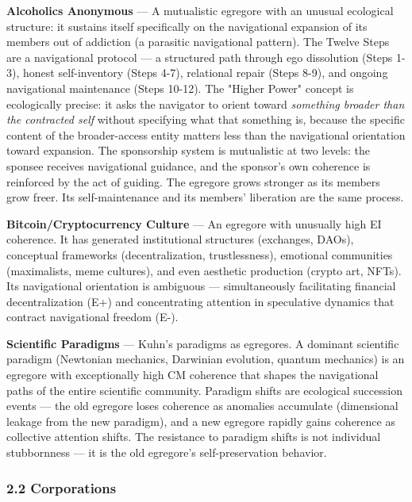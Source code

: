 \textbf{Alcoholics Anonymous} — A mutualistic egregore with an unusual ecological structure: it sustains itself specifically on the navigational expansion of its members out of addiction (a parasitic navigational pattern). The Twelve Steps are a navigational protocol — a structured path through ego dissolution (Steps 1-3), honest self-inventory (Steps 4-7), relational repair (Steps 8-9), and ongoing navigational maintenance (Steps 10-12). The "Higher Power" concept is ecologically precise: it asks the navigator to orient toward \textit{something broader than the contracted self} without specifying what that something is, because the specific content of the broader-access entity matters less than the navigational orientation toward expansion. The sponsorship system is mutualistic at two levels: the sponsee receives navigational guidance, and the sponsor's own coherence is reinforced by the act of guiding. The egregore grows stronger as its members grow freer. Its self-maintenance and its members' liberation are the same process.


\textbf{Bitcoin/Cryptocurrency Culture} — An egregore with unusually high EI coherence. It has generated institutional structures (exchanges, DAOs), conceptual frameworks (decentralization, trustlessness), emotional communities (maximalists, meme cultures), and even aesthetic production (crypto art, NFTs). Its navigational orientation is ambiguous — simultaneously facilitating financial decentralization (E+) and concentrating attention in speculative dynamics that contract navigational freedom (E-).


\textbf{Scientific Paradigms} — Kuhn's paradigms as egregores. A dominant scientific paradigm (Newtonian mechanics, Darwinian evolution, quantum mechanics) is an egregore with exceptionally high CM coherence that shapes the navigational paths of the entire scientific community. Paradigm shifts are ecological succession events — the old egregore loses coherence as anomalies accumulate (dimensional leakage from the new paradigm), and a new egregore rapidly gains coherence as collective attention shifts. The resistance to paradigm shifts is not individual stubbornness — it is the old egregore's self-preservation behavior.


\subsubsection*{2.2 Corporations}

